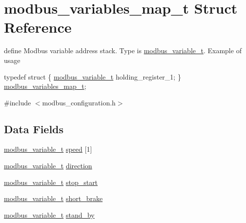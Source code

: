 \hypertarget{structmodbus__variables__map__t}{}\section{modbus\+\_\+variables\+\_\+map\+\_\+t Struct Reference}
\label{structmodbus__variables__map__t}


define Modbus variable address stack. Type is \mbox{\hyperlink{structmodbus__variable__t}{modbus\+\_\+variable\+\_\+t}}. Example of usage 
\begin{DoxyCode}
\textcolor{keyword}{typedef} \textcolor{keyword}{struct }\{
   \mbox{\hyperlink{structmodbus__variable__t}{modbus\_variable\_t}} holding\_register\_1;
\} \mbox{\hyperlink{structmodbus__variables__map__t}{modbus\_variables\_map\_t}};
\end{DoxyCode}
  




{\ttfamily \#include $<$modbus\+\_\+configuration.\+h$>$}

\subsection*{Data Fields}
\begin{DoxyCompactItemize}
\item 
\mbox{\hyperlink{structmodbus__variable__t}{modbus\+\_\+variable\+\_\+t}} \mbox{\hyperlink{structmodbus__variables__map__t_ac9404c6a1ee54faa3026cb67df31d228}{speed}} \mbox{[}1\mbox{]}
\item 
\mbox{\hyperlink{structmodbus__variable__t}{modbus\+\_\+variable\+\_\+t}} \mbox{\hyperlink{structmodbus__variables__map__t_a43804420cb4ea833a33787203dbda708}{direction}}
\item 
\mbox{\hyperlink{structmodbus__variable__t}{modbus\+\_\+variable\+\_\+t}} \mbox{\hyperlink{structmodbus__variables__map__t_a3a2bcd493519187817f59405ec4762df}{stop\+\_\+start}}
\item 
\mbox{\hyperlink{structmodbus__variable__t}{modbus\+\_\+variable\+\_\+t}} \mbox{\hyperlink{structmodbus__variables__map__t_a4900eb2be91da62d0f8e1c8834f3f728}{short\+\_\+brake}}
\item 
\mbox{\hyperlink{structmodbus__variable__t}{modbus\+\_\+variable\+\_\+t}} \mbox{\hyperlink{structmodbus__variables__map__t_a71fcc7699935d8d17d3c47cc32112d30}{stand\+\_\+by}}
\end{DoxyCompactItemize}


